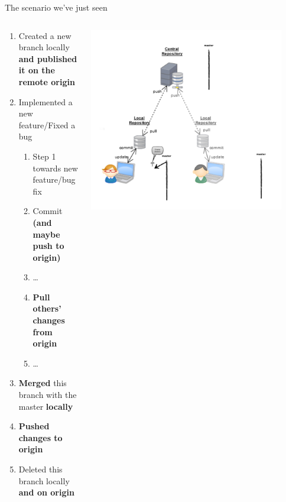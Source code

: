
\begin{frame}[fragile]{The scenario we've just seen}
\begin{columns}
\begin{column}{0.5\textwidth}
	\tiny
	\begin{enumerate}
		\item<1-2> Created a new branch locally \\\textbf{and published it on the remote origin}
		\item<3-4> Implemented a new feature/Fixed a bug
		\begin{enumerate}
			\tiny
			\item<3> Step 1 towards new feature/bug fix
			\item<3> Commit \textbf{(and maybe push to origin)}
			\item<3> \ldots
			\item<4> \textbf{Pull others' changes from origin}
			\item<4> \ldots
		\end{enumerate}
		\item<5> \textbf{Merged} this branch with the master \textbf{locally}
		\item<6> \textbf{Pushed changes to origin}
		\item<7-> Deleted this branch locally \textbf{and on origin}
	\end{enumerate}
\end{column}
\begin{column}{0.6\textwidth}
	\begin{center}
			 {
				\includegraphics[width=0.9\textwidth]{multiuser_local_branch}
}
\end{center}
\end{column}
\end{columns}
\end{frame}
